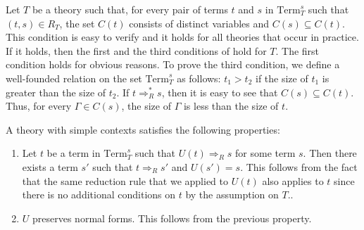 \documentclass[reqno]{amsart}
\theoremstyle{definition}
\theoremstyle{remark}
\newcommand{\Term}{\mathrm{Term}}
\numberwithin{figure}{section}
\begin{document}
Let $T$ be a theory such that, for every pair of terms $t$ and $s$ in $\Term_T^s$ such that $(t,s) \in R_T$, the set $C(t)$ consists of distinct variables and $C(s) \subseteq C(t)$.
This condition is easy to verify and it holds for all theories that occur in practice.
If it holds, then the first and the third conditions of  hold for $T$.
The first condition holds for obvious reasons.
To prove the third condition, we define a well-founded relation on the set $\Term_T^s$ as follows: $t_1 > t_2$ if the size of $t_1$ is greater than the size of $t_2$.
If $t \Rightarrow_R^* s$, then it is easy to see that $C(s) \subseteq C(t)$.
Thus, for every $\Gamma \in C(s)$, the size of $\Gamma$ is less than the size of $t$.

A theory with simple contexts satisfies the following properties:
\begin{enumerate}
\item \label{it:red-fib} Let $t$ be a term in $\Term_T^s$ such that $U(t) \Rightarrow_R s$ for some term $s$.
Then there exists a term $s'$ such that $t \Rightarrow_R s'$ and $U(s') = s$.
This follows from the fact that the same reduction rule that we applied to $U(t)$ also applies to $t$ since there is no additional conditions on $t$ by the assumption on $T$..
\item \label{it:red-nf} $U$ preserves normal forms. This follows from the previous property.
\end{enumerate}
\end{document}
